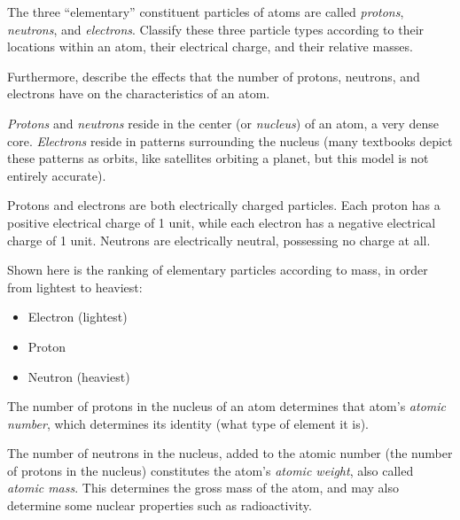 

The three ``elementary'' constituent particles of atoms are called {\it protons}, {\it neutrons}, and {\it electrons}.  Classify these three particle types according to their locations within an atom, their electrical charge, and their relative masses.

Furthermore, describe the effects that the number of protons, neutrons, and electrons have on the characteristics of an atom.







{\it Protons} and {\it neutrons} reside in the center (or {\it nucleus}) of an atom, a very dense core.  {\it Electrons} reside in patterns surrounding the nucleus (many textbooks depict these patterns as orbits, like satellites orbiting a planet, but this model is not entirely accurate).

Protons and electrons are both electrically charged particles.  Each proton has a positive electrical charge of 1 unit, while each electron has a negative electrical charge of 1 unit.  Neutrons are electrically neutral, possessing no charge at all.

Shown here is the ranking of elementary particles according to mass, in order from lightest to heaviest:

\begin{itemize}
\item{} Electron (lightest)
\item{} Proton
\item{} Neutron (heaviest)
\end{itemize} 

\vskip 10pt

The number of protons in the nucleus of an atom determines that atom's {\it atomic number}, which determines its identity (what type of element it is).

The number of neutrons in the nucleus, added to the atomic number (the number of protons in the nucleus) constitutes the atom's {\it atomic weight}, also called {\it atomic mass}.  This determines the gross mass of the atom, and may also determine some nuclear properties such as radioactivity.

